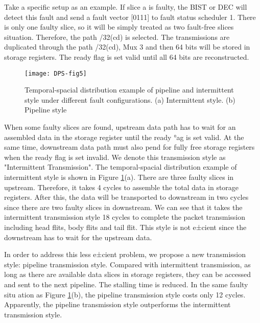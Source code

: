 Take a specific setup as an example. If slice a is faulty, the BIST or DEC will detect this fault and send a fault vector [0111] to fault status scheduler 1. There is only one faulty slice, so it will be simply treated as two fault-free slices situation. Therefore, the path /32(cd) is selected. The transmissions are duplicated through the path /32(cd), Mux 3 and then 64 bits will be stored in storage registers. The ready flag is set valid until all 64 bits are reconstructed.

\begin{figure}[h]
      \centering
        \texttt{[image: DPS-fig5]}
        \caption{Temporal-spacial distribution example of pipeline and intermittent style under different fault configurations. (a) Intermittent style. (b) Pipeline style}
        \label{fig:dps-fig5}
\end{figure}


When some faulty slices are found, upstream data path has to wait for an assembled data in the storage register until the ready °ag is set valid. At the same time, downstream data path must also pend for fully free storage registers when the ready flag is set invalid. We denote this transmission style as "Intermittent Transmission". The temporal-spacial distribution example of intermittent style is shown in Figure \ref{fig:dps-fig5}(a). There are three faulty slices in upstream. Therefore, it takes 4 cycles to assemble the total data in storage registers. After this, the data will be transported to downstream in two cycles since there are two faulty slices in downstream. We can see that it takes the intermittent transmission style 18 cycles to complete the packet transmission including head flits, body flits and tail flit. This style is not e±cient since the downstream has to wait for the upstream data.

In order to address this less e±cient problem, we propose a new transmission style: pipeline transmission style. Compared with intermittent transmission, as long as there are available data slices in storage registers, they can be accessed and sent to the next pipeline. The stalling time is reduced. In the same faulty situ
ation as Figure \ref{fig:dps-fig5}(b), the pipeline transmission style costs only 12 cycles. Apparently, the pipeline transmission style outperforms the intermittent transmission style.

